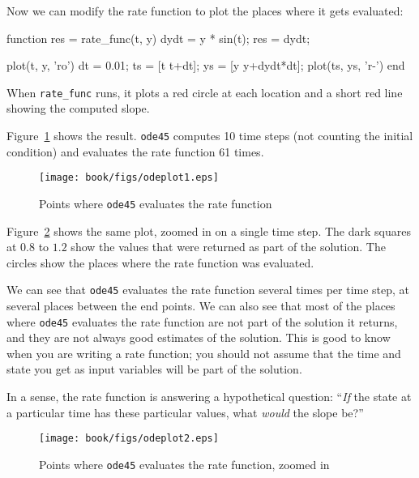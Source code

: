 
Now we can modify the rate function to plot the places where it gets evaluated:

\begin{code}
function res = rate_func(t, y)
    dydt = y * sin(t);
    res = dydt;

    plot(t, y, 'ro')
    dt = 0.01;
    ts = [t t+dt];
    ys = [y y+dydt*dt];
    plot(ts, ys, 'r-')
end
\end{code}

When \lstinline{rate_func} runs, it plots a red circle at each location and a short red line showing the computed slope.


Figure~\ref{fig:odeplot1} shows the result.  \lstinline{ode45} computes 10 time steps (not counting the initial condition) and evaluates the rate function 61 times.

\begin{figure}
\centerline{\texttt{[image: book/figs/odeplot1.eps]}}
\caption{Points where \lstinline{ode45} evaluates the rate function}
\label{fig:odeplot1}
\end{figure}

Figure~\ref{fig:odeplot2} shows the same plot, zoomed in on a single time step.
The dark squares at $0.8$ to $1.2$ show the values that were returned as part of the solution.
The circles show the places where the rate function was evaluated.

We can see that \lstinline{ode45} evaluates the rate function several times per time step, at several places between the end points.
We can also see that most of the places where \lstinline{ode45} evaluates the rate function are not part of the solution it returns, and they are not always good estimates of the solution.
This is good to know when you are writing a rate function; you should not assume that the time and state you get as input variables will be part of the solution.

In a sense, the rate function is answering a hypothetical question: ``{\em If} the state at a particular time has these particular values, what {\em would} the slope be?''

\begin{figure}
\centerline{\texttt{[image: book/figs/odeplot2.eps]}}
\caption{Points where \lstinline{ode45} evaluates the rate function, zoomed in}
\label{fig:odeplot2}
\end{figure}

